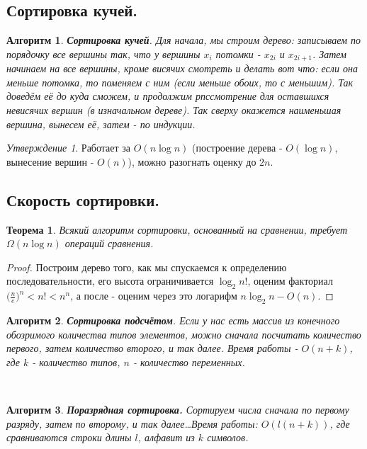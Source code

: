 \documentclass[a4paper]{article}
\theoremstyle{indented}
\newtheorem{theorem}{Теорема}
\newtheorem{alg}{Алгоритм}
\theoremstyle{definition}
\theoremstyle{remark}
\newtheorem{stat}{Утверждение}
\begin{document}
\subsection{Сортировка кучей.}

\begin{alg}
    \textbf{Сортировка кучей}. Для начала, мы строим дерево: записываем по порядочку все вершины так, что у вершины $x_i$ потомки - $x_{2i}$ и $x_{2i+1}$. Затем начинаем на все вершины, кроме висячих смотреть и делать вот что: если она меньше потомка, то поменяем с ним (если меньше обоих, то с меньшим). Так доведём её до куда сможем, и продолжим рпссмотрение для оставшихся невисячих вершин (в изначальном дереве). Так сверху окажется наименьшая вершина, вынесем её, затем - по индукции.
\end{alg}

\begin{stat}
    Работает за $O(n\log n)$ (построение дерева - $O(\log n)$, вынесение вершин - $O(n)$), можно разогнать оценку до $2n$. 
\end{stat}

\subsection{Скорость сортировки.} 
 
\begin{theorem}
    Всякий алгоритм сортировки, основанный на сравнении, требует $\Omega (n\log n)$ операций сравнения.
\end{theorem}

\begin{proof}
    Построим дерево того, как мы спускаемся к определению последовательности, его высота ограничивается $\log_2n!$, оценим факториал $\biggl(\frac{n}{e}\biggr)^n<n!<n^n$, а после - оценим через это логарифм $n\log_2n - O(n)$. 
\end{proof}

\begin{alg}
    \textbf{Сортировка подсчётом}. Если у нас есть массив из конечного обозримого количества типов элементов, можно сначала посчитать количество первого, затем количество второго, и так далее. Время работы - $O(n+k)$, где $k$ - количество типов, $n$ - количество переменных.
\end{alg} \ 

\begin{alg}
    \textbf{Поразрядная сортировка.} Сортируем числа сначала по первому разряду, затем по второму, и так далее\dots Время работы: $O(l(n+k))$, где сравниваются строки длины $l$, алфавит из $k$ символов.
\end{alg}
\end{document}
